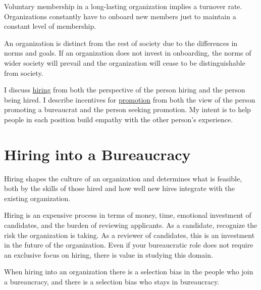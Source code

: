 

Voluntary membership in a long-lasting organization implies a turnover rate. Organizations constantly have to onboard new members just to maintain a constant level of membership.

An organization is distinct from the rest of society due to the differences in norms and goals. If an organization does not invest in onboarding, the norms of wider society will prevail and the organization will cease to be distinguishable from society.

I discuss \hyperref[sec:hiring]{hiring}\iftoggle{haspagenumbers}{ (see page~\pageref{sec:hiring})}{}
from both the perspective of the person hiring and the person being hired. 
I describe incentives for \hyperref[sec:promotion]{promotion}\iftoggle{haspagenumbers}{ (see page~\pageref{sec:promotion})}{}
from both the view of the person promoting a bureaucrat and the person seeking promotion. 
My intent is to help people in each position build empathy with the other person's experience. 


\section{Hiring into a Bureaucracy\label{sec:hiring}}


Hiring shapes the culture of an organization and determines what is feasible, both by the skills of those hired and how well new hires integrate with the existing organization. 

Hiring is an expensive process in terms of money, time, emotional investment of candidates, and the burden of reviewing applicants. 
As a candidate, recognize the risk the organization is taking. 
As a reviewer of candidates, this is an investment in the future of the organization. Even if your bureaucratic role does not require an exclusive focus on hiring, there is value in studying this domain. 

When hiring into an organization there is a selection bias in the people who join a bureaucracy, and there is a selection bias who stays in bureaucracy. 

